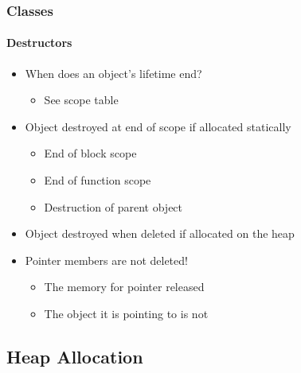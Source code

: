 \documentclass[table]{beamer}
\newcommand{\declarelesson}{\textbf{\color{themegreen}{Lesson:}} }
\begin{document}
\begin{frame}
    \frametitle{\declarelesson Classes}
    \framesubtitle{Destructors}
    \begin{itemize}
        \item When does an object's lifetime end?
            \begin{itemize}
                \item See scope table
            \end{itemize}
        \item Object destroyed at end of scope if allocated statically
            \begin{itemize}
                \item End of block scope
                \item End of function scope
                \item Destruction of parent object
            \end{itemize}
        \item Object destroyed when deleted if allocated on the heap
        \item Pointer members are not deleted!
            \begin{itemize}
                \item The memory for pointer released
                \item The object it is pointing to is not
            \end{itemize}
    \end{itemize}
\end{frame}


\subsection{Heap Allocation}
\frame{\subsectionpage}
\end{document}
